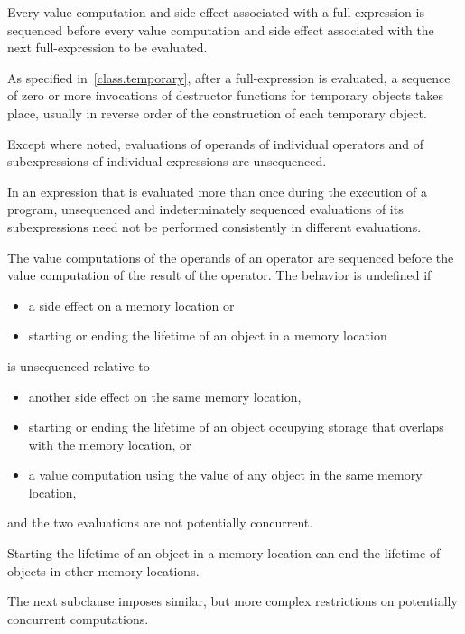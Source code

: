 \pnum
Every
%
value computation and
%
side effect associated with a full-expression is
sequenced before every value computation and side effect associated with the
next full-expression to be evaluated.
\begin{footnote}
As specified
in~\ref{class.temporary}, after a full-expression is evaluated, a sequence of
zero or more invocations of destructor functions for temporary objects takes
place, usually in reverse order of the construction of each temporary object.
\end{footnote}

\pnum
{}%
Except where noted, evaluations of operands of individual operators and
of subexpressions of individual expressions are unsequenced.
\begin{note}
In an expression that is evaluated more than once during the execution
of a program, unsequenced and indeterminately sequenced evaluations of
its subexpressions need not be performed consistently in different
evaluations.
\end{note}
The value computations of the operands of an
operator are sequenced before the value computation of the result of the
operator.
The behavior is undefined if
\begin{itemize}
\item
{}%
a side effect on a memory location or
\item
starting or ending the lifetime of an object in a memory location
\end{itemize}
is unsequenced relative to
\begin{itemize}
\item
another side effect on the same memory location,
\item
starting or ending the lifetime of an object occupying storage that
overlaps with the memory location, or
\item
a value computation using the value of any object in the same memory location,
\end{itemize}
and the two evaluations are not potentially concurrent.
\begin{note}
Starting the lifetime of an object in a memory location can end the lifetime of
objects in other memory locations.
\end{note}
\begin{note}
The next subclause imposes similar, but more complex restrictions on
potentially concurrent computations.
\end{note}

